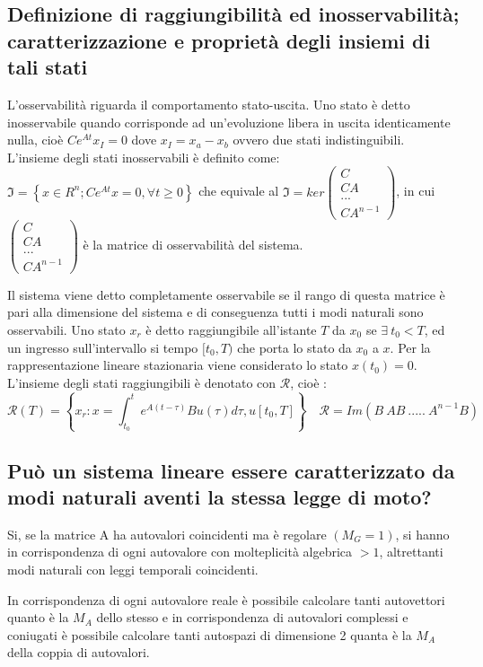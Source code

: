 \documentclass{article}
\begin{document}
\subsection{Definizione di raggiungibilità ed inosservabilità; caratterizzazione e proprietà degli insiemi di tali stati}
L'osservabilità riguarda il comportamento stato-uscita.
Uno stato è detto inosservabile quando corrisponde ad un'evoluzione libera in uscita identicamente nulla,
cioè $Ce^{At}x_I=0$ dove $x_I=x_a-x_b$ ovvero due stati indistinguibili.
L'insieme degli stati inosservabili è definito come:
$\mathfrak{I} =\left\{ x \in R^n ; Ce^{At}x=0 , \forall t \geq 0 \right\}$ che equivale al 
$\mathfrak{I}=ker \begin{pmatrix}C\\CA\\...\\CA^{n-1}\end{pmatrix}$,
in cui $\begin{pmatrix}C\\CA\\...\\CA^{n-1}\end{pmatrix}$ è la matrice di osservabilità del sistema.

Il sistema viene detto completamente osservabile se il rango di questa matrice è pari alla dimensione del sistema
e di conseguenza tutti i modi naturali sono osservabili.
Uno stato $x_r$ è detto raggiungibile all'istante $T$ da $x_0$ se $\exists\ t_0<T$, ed un ingresso sull'intervallo si tempo $[t_0,T)$
che porta lo stato da $x_0$ a $x$.
Per la rappresentazione lineare stazionaria viene considerato lo stato $x(t_0)=0$. 
L'insieme degli stati raggiungibili è denotato con $\mathcal{R}$, cioè :
\[ \mathcal{R}(T)=\left\{x_r : x=\int_{t_0}^{t}e^{A(t-\tau)}Bu(\tau)d\tau, u[t_0,T]\right\}
\quad \mathcal{R}=
Im(B\ AB\ .....\ A^{n-1}B)\]

\subsection{Può un sistema lineare essere caratterizzato da modi naturali aventi la stessa legge di moto?}
Si, se la matrice A ha autovalori coincidenti ma è regolare $(M_G=1)$,
si hanno in corrispondenza di ogni autovalore con molteplicità algebrica $>1$,
altrettanti modi naturali con leggi temporali coincidenti.

In corrispondenza di ogni autovalore reale è possibile calcolare tanti autovettori quanto è la
$M_A$ dello stesso e in corrispondenza di autovalori complessi e coniugati
è possibile calcolare tanti autospazi di dimensione 2 quanta è la $M_A$
della coppia di autovalori.
\end{document}
